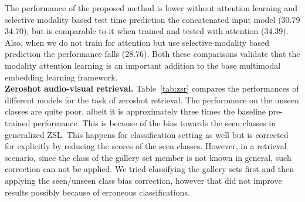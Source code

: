 The performance of the proposed method is lower without attention learning and selective modality based test time prediction \cf the concatenated input model ($30.79$ \vs $34.70$), but is comparable to it when trained and tested with attention ($34.39$). Also, when we do not train for attention but use selective modality based prediction the performance falls ($28.76$). Both these comparisons validate that the modality attention learning is an important addition to the base multimodal embedding learning framework.
\vspace{0.5em}\\
\textbf{Zeroshot audio-visual retrieval.}
Table~\ref{tab:zsr} compares the performances of different models for the task of zeroshot retrieval. 
The performance on the unseen classes are quite poor, albeit it is approximately three times the baseline pre-trained performance. This is because of the bias towards the seen classes in generalized ZSL. This happens for classification setting as well but is corrected for explicitly by reducing the scores of the seen classes. However, in a retrieval scenario, since the class of the gallery set member is not known in general, such correction can not be applied. We tried classifying the gallery sets first and then applying the seen/unseen class bias correction, however that did not improve results possibly because of erroneous classifications.

